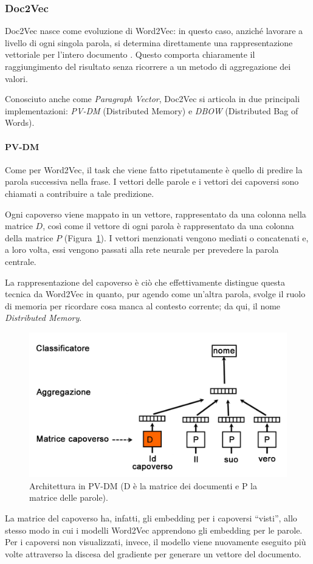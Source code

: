 \documentclass[12pt]{report}
\theoremstyle{definition}
\begin{document}
\subsubsection{Doc2Vec} \label{d2v}
Doc2Vec nasce come evoluzione di Word2Vec: in questo caso, anziché lavorare a livello di ogni singola parola, si determina direttamente una rappresentazione vettoriale per l'intero documento \cite{24}.
Questo comporta chiaramente il raggiungimento del risultato senza ricorrere a un metodo di aggregazione dei valori.

Conosciuto anche come \textit{Paragraph Vector}, Doc2Vec si articola in due principali implementazioni: \textit{PV-DM} (Distributed Memory) e \textit{DBOW} (Distributed Bag of Words).

\paragraph{PV-DM} 
Come per Word2Vec, il task che viene fatto ripetutamente è quello di predire la parola successiva nella frase. I vettori delle parole e i vettori dei capoversi sono chiamati a contribuire a tale predizione.

Ogni capoverso viene mappato in un vettore, rappresentato da una colonna nella matrice $D$, così come il vettore di ogni parola è rappresentato da una colonna della matrice $P$ (Figura~\ref{pvdm}). I vettori menzionati vengono mediati o concatenati e, a loro volta, essi vengono passati alla rete neurale per prevedere la parola centrale.

La rappresentazione del capoverso è ciò che effettivamente distingue questa tecnica da Word2Vec in quanto, pur agendo come un'altra parola, svolge il ruolo di memoria per ricordare cosa manca al contesto corrente; da qui, il nome \textit{Distributed Memory}.
\begin{figure}
    \centering
    \includegraphics[scale = 0.3]{images/pvdm.png}
    \caption{Architettura in PV-DM (D è la matrice dei documenti e P la matrice delle parole).}
    \label{pvdm}
\end{figure}
La matrice del capoverso ha, infatti, gli embedding per i capoversi ``visti'', allo stesso modo in cui i modelli Word2Vec apprendono gli embedding per le parole. Per i capoversi non visualizzati, invece, il modello viene nuovamente eseguito più volte attraverso la discesa del gradiente per generare un vettore del documento. 
\end{document}
